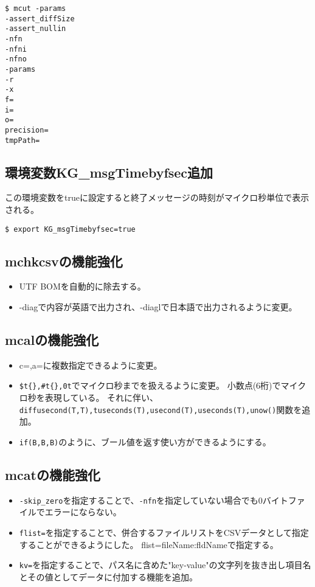 \begin{Verbatim}[baselinestretch=0.7,frame=single]
$ mcut -params
-assert_diffSize
-assert_nullin
-nfn
-nfni
-nfno
-params
-r
-x
f=
i=
o=
precision=
tmpPath=
\end{Verbatim}

\subsection{環境変数KG\_msgTimebyfsec追加}
この環境変数をtrueに設定すると終了メッセージの時刻がマイクロ秒単位で表示される。

\begin{Verbatim}[baselinestretch=0.7,frame=single]
$ export KG_msgTimebyfsec=true
\end{Verbatim}

\subsection{mchkcsvの機能強化}

\begin{itemize}
 \item UTF BOMを自動的に除去する。
 \item -diagで内容が英語で出力され、-diaglで日本語で出力されるように変更。
\end{itemize}

\subsection{mcalの機能強化}
\begin{itemize}
 \item c=,a=に複数指定できるように変更。
 \item \verb|$t{},#t{},0t|でマイクロ秒までを扱えるように変更。
小数点(6桁)でマイクロ秒を表現している。
それに伴い、\verb|diffusecond(T,T),tuseconds(T),usecond(T),useconds(T),unow()|関数を追加。
 \item \verb|if(B,B,B)|のように、ブール値を返す使い方ができるようにする。
\end{itemize}

\subsection{mcatの機能強化}
\begin{itemize}
 \item \verb|-skip_zero|を指定することで、\verb|-nfn|を指定していない場合でも0バイトファイルでエラーにならない。
 \item \verb|flist=|を指定することで、併合するファイルリストをCSVデータとして指定することができるようにした。
        flist=fileName:fldNameで指定する。
 \item \verb|kv=|を指定することで、パス名に含めた"key-value"の文字列を抜き出し項目名とその値としてデータに付加する機能を追加。
\end{itemize}

